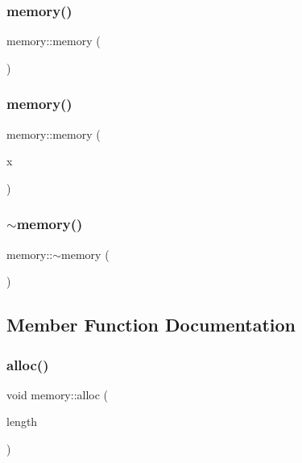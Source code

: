 \subsubsection{\texorpdfstring{memory()}{memory()}\hspace{0.1cm}{\footnotesize\ttfamily [1/2]}}
{\footnotesize\ttfamily memory\+::memory (\begin{DoxyParamCaption}{ }\end{DoxyParamCaption})}

\mbox{\label{classmemory_ade21bbe488443d2d3eb7b82a868298a6}} 
\subsubsection{\texorpdfstring{memory()}{memory()}\hspace{0.1cm}{\footnotesize\ttfamily [2/2]}}
{\footnotesize\ttfamily memory\+::memory (\begin{DoxyParamCaption}\item[{const \mbox{\hyperlink{classdiscreta__base}{discreta\+\_\+base}} \&}]{x }\end{DoxyParamCaption})}

\mbox{\label{classmemory_ae5893b724ce22f38b776558384f21680}} 
\subsubsection{\texorpdfstring{$\sim$memory()}{~memory()}}
{\footnotesize\ttfamily memory\+::$\sim$memory (\begin{DoxyParamCaption}{ }\end{DoxyParamCaption})}



\subsection{Member Function Documentation}
\mbox{\label{classmemory_a44ac20be537668e94b5d42e6a6c74b6f}} 
\subsubsection{\texorpdfstring{alloc()}{alloc()}}
{\footnotesize\ttfamily void memory\+::alloc (\begin{DoxyParamCaption}\item[{\mbox{\hyperlink{galois_8h_a09fddde158a3a20bd2dcadb609de11dc}{I\+NT}}}]{length }\end{DoxyParamCaption})}

